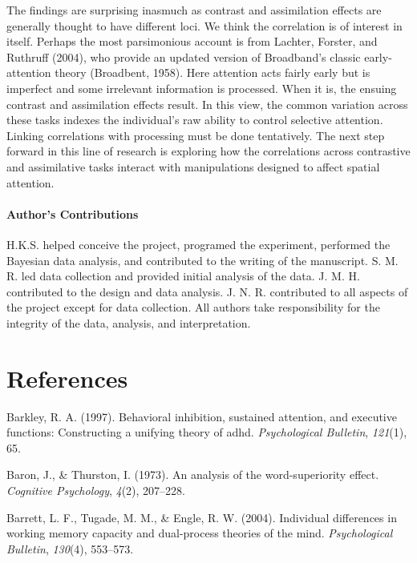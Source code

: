 \documentclass[english,floatsintext,man]{apa6}
\theoremstyle{definition}
\theoremstyle{definition}
\theoremstyle{definition}
\theoremstyle{remark}
\begin{document}
The findings are surprising inasmuch as contrast and assimilation
effects are generally thought to have different loci. We think the
correlation is of interest in itself. Perhaps the most parsimonious
account is from Lachter, Forster, and Ruthruff (2004), who provide an
updated version of Broadband's classic early-attention theory
(Broadbent, 1958). Here attention acts fairly early but is imperfect and
some irrelevant information is processed. When it is, the ensuing
contrast and assimilation effects result. In this view, the common
variation across these tasks indexes the individual's raw ability to
control selective attention. Linking correlations with processing must
be done tentatively. The next step forward in this line of research is
exploring how the correlations across contrastive and assimilative tasks
interact with manipulations designed to affect spatial attention.

\paragraph{Author's Contributions}\label{authors-contributions}

H.K.S. helped conceive the project, programed the experiment, performed
the Bayesian data analysis, and contributed to the writing of the
manuscript. S. M. R. led data collection and provided initial analysis
of the data. J. M. H. contributed to the design and data analysis. J. N.
R. contributed to all aspects of the project except for data collection.
All authors take responsibility for the integrity of the data, analysis,
and interpretation.

\newpage

\section{References}\label{references}

\setlength{\parindent}{-0.5in} \setlength{\leftskip}{0.5in}

\hypertarget{refs}{}
\hypertarget{ref-Barkley:1997}{}
Barkley, R. A. (1997). Behavioral inhibition, sustained attention, and
executive functions: Constructing a unifying theory of adhd.
\emph{Psychological Bulletin}, \emph{121}(1), 65.

\hypertarget{ref-Baron:Thurston:1973}{}
Baron, J., \& Thurston, I. (1973). An analysis of the word-superiority
effect. \emph{Cognitive Psychology}, \emph{4}(2), 207--228.

\hypertarget{ref-Barrett:etal:2004}{}
Barrett, L. F., Tugade, M. M., \& Engle, R. W. (2004). Individual
differences in working memory capacity and dual-process theories of the
mind. \emph{Psychological Bulletin}, \emph{130}(4), 553--573.
\end{document}
